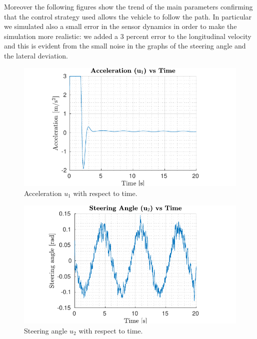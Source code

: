 \documentclass[conference, 11pt]{IEEEtran}
\begin{document}
Moreover the following figures show the trend of the main parameters confirming that the control strategy used allows the vehicle to follow the path. In particular we simulated also a small error in the sensor dynamics in order to make the simulation more realistic: we added a 3 percent error to the longitudinal velocity and this is evident from the small noise in the graphs of the steering angle and the lateral deviation.

\begin{figure}[!h]
	\centering
	\hspace*{-0.5in}
	\includegraphics[width=1.29\columnwidth]{../../MATLAB/lane_following/figure/AccelerationVsTime.pdf}
	\caption{Acceleration $u_1$ with respect to time.}
	\label{fig:acceleration_laneFollowing}
\end{figure}
\begin{figure}[!h]
	\centering
	\hspace*{-0.5in}
	\includegraphics[width=1.29\columnwidth]{../../MATLAB/lane_following/figure/SteeringAngleVsTime.pdf}
	\caption{Steering angle $u_2$ with respect to time.}
	\label{fig:steering_laneFollowing}
\end{figure}
\end{document}
